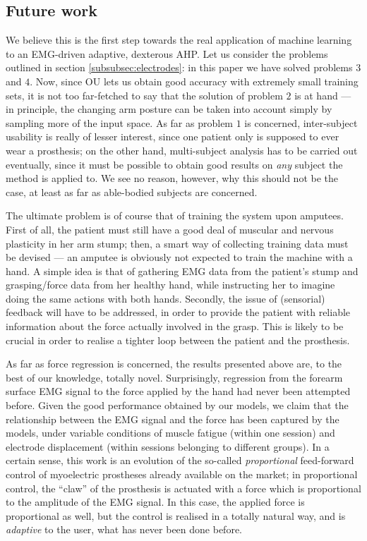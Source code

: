 \subsection*{Future work}

We believe this is the first step towards the real application of
machine learning to an EMG-driven adaptive, dexterous AHP. Let us
consider the problems outlined in section \ref{subsubsec:electrodes}:
in this paper we have solved problems $3$ and $4$. Now, since OU lets
us obtain good accuracy with extremely small training sets, it is not
too far-fetched to say that the solution of problem $2$ is at hand ---
in principle, the changing arm posture can be taken into account
simply by sampling more of the input space. As far as problem $1$ is
concerned, inter-subject usability is really of lesser interest, since
one patient only is supposed to ever wear a prosthesis; on the other
hand, multi-subject analysis has to be carried out eventually, since
it must be possible to obtain good results on \emph{any} subject the
method is applied to. We see no reason, however, why this should not
be the case, at least as far as able-bodied subjects are concerned.

The ultimate problem is of course that of training the system upon
amputees. First of all, the patient must still have a good deal of
muscular and nervous plasticity in her arm stump; then, a smart way of
collecting training data must be devised --- an amputee is obviously
not expected to train the machine with a hand. A simple idea is that
of gathering EMG data from the patient's stump and grasping/force data
from her healthy hand, while instructing her to imagine doing the same
actions with both hands. Secondly, the issue of (sensorial) feedback
will have to be addressed, in order to provide the patient with
reliable information about the force actually involved in the
grasp. This is likely to be crucial in order to realise a tighter loop
between the patient and the prosthesis.

As far as force regression is concerned, the results presented above
are, to the best of our knowledge, totally novel. Surprisingly,
regression from the forearm surface EMG signal to the force applied by
the hand had never been attempted before. Given the good performance
obtained by our models, we claim that the relationship between the EMG
signal and the force has been captured by the models, under variable
conditions of muscle fatigue (within one session) and electrode
displacement (within sessions belonging to different groups). In a
certain sense, this work is an evolution of the so-called
\emph{proportional} feed-forward control of myoelectric prostheses already
available on the market; in proportional control, the ``claw'' of the
prosthesis is actuated with a force which is proportional to the
amplitude of the EMG signal. In this case, the applied force is
proportional as well, but the control is realised in a totally natural
way, and is \emph{adaptive} to the user, what has never been done
before.
